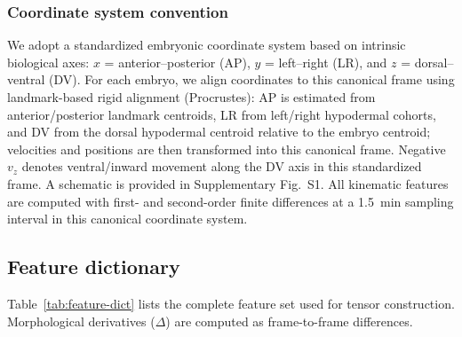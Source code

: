 \documentclass[unnumsec,webpdf,modern,large,namedate]{oup-authoring-template}%
\theoremstyle{thmstyleone}\newtheorem{theorem}{Theorem}
\theoremstyle{thmstyletwo}\newtheorem{example}{Example}
\theoremstyle{thmstylethree}\newtheorem{definition}{Definition}
\begin{document}
\subsubsection{Coordinate system convention}
We adopt a standardized embryonic coordinate system based on intrinsic biological axes: $x$ = anterior--posterior (AP), $y$ = left--right (LR), and $z$ = dorsal--ventral (DV). For each embryo, we align coordinates to this canonical frame using landmark-based rigid alignment (Procrustes): AP is estimated from anterior/posterior landmark centroids, LR from left/right hypodermal cohorts, and DV from the dorsal hypodermal centroid relative to the embryo centroid; velocities and positions are then transformed into this canonical frame. Negative $v_z$ denotes ventral/inward movement along the DV axis in this standardized frame. A schematic is provided in Supplementary Fig.~S1. All kinematic features are computed with first- and second-order finite differences at a 1.5~min sampling interval in this canonical coordinate system.

\subsection{Feature dictionary}
Table~\ref{tab:feature-dict} lists the complete feature set used for tensor construction. Morphological derivatives ($\Delta$) are computed as frame-to-frame differences.
\end{document}
